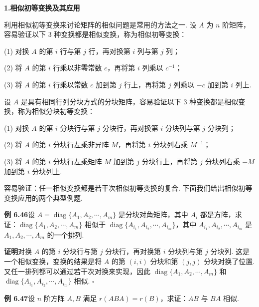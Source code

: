 \documentclass[UTF8,12pt,a4paper,fontset=fandol]{ctexart}
\begin{document}
\noindent\textbf{1.\quad 相似初等变换及其应用}

利用相似初等变换来讨论矩阵的相似问题是常用的方法之一. 设 $A$ 为 $n$ 阶矩阵，容易验证以下 3 种变换都是相似变换，称为相似初等变换：

(1) 对换 $A$ 的第 $i$ 行与第 $j$ 行，再对换第 $i$ 列与第 $j$ 列；

(2) 将 $A$ 的第 $i$ 行乘以非零常数 $c$，再将第 $i$ 列乘以 $c^{-1}$；

(3) 将 $A$ 的第 $i$ 行乘以常数 $c$ 加到第 $j$ 行上，再将第 $j$ 列乘以 $-c$ 加到第 $i$ 列上.

设 $A$ 是具有相同行列分块方式的分块矩阵，容易验证以下 3 种变换都是相似变换，称为相似分块初等变换：

(1) 对换 $A$ 的第 $i$ 分块行与第 $j$ 分块行，再对换第 $i$ 分块列与第 $j$ 分块列；

(2) 将 $A$ 的第 $i$ 分块行左乘非异阵 $M$，再将第 $i$ 分块列右乘 $M^{-1}$；

(3) 将 $A$ 的第 $i$ 分块行左乘矩阵 $M$ 加到第 $j$ 分块行上，再将第 $j$ 分块列右乘 $-M$ 加到第 $i$ 分块列上.

容易验证：任一相似变换都是若干次相似初等变换的复合. 下面我们给出相似初等变换应用的两个典型例题.

\noindent\textbf{例 6.46}\quad 设 $A=\operatorname{diag}\{A_1,A_2,\cdots,A_m\}$ 是分块对角矩阵，其中 $A_i$ 都是方阵，求证：$\operatorname{diag}\{A_1,A_2,\cdots,A_m\}$ 相似于 $\operatorname{diag}\{A_{i_1},A_{i_2},\cdots,A_{i_m}\}$，其中 $A_{i_1},A_{i_2},\cdots,A_{i_m}$ 是 $A_1,A_2,\cdots,A_m$ 的一个排列.

\noindent\textbf{证明}\quad 对换 $A$ 的第 $i$ 分块行与第 $j$ 分块行，再对换第 $i$ 分块列与第 $j$ 分块列. 这是一个相似变换，变换的结果是将 $A$ 的第 $(i,i)$ 分块和第 $(j,j)$ 分块对换了位置. 又任一排列都可以通过若干次对换来实现，因此 $\operatorname{diag}\{A_1,A_2,\cdots,A_m\}$ 和 $\operatorname{diag}\{A_{i_1},A_{i_2},\cdots,A_{i_m}\}$ 相似. $\square$

\noindent\textbf{例 6.47}\quad 设 $n$ 阶方阵 $A,B$ 满足 $r(ABA)=r(B)$，求证：$AB$ 与 $BA$ 相似.
\end{document}
